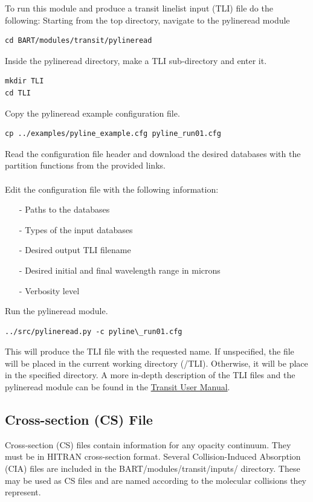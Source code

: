 \documentclass[letterpaper, 12pt]{article}
\begin{document}
\noindent
To run this module and produce a transit linelist input (TLI) file do the following:
\noindent
Starting from the top directory, navigate to the pylineread module

\begin{verbatim}
cd BART/modules/transit/pylineread
\end{verbatim}

\noindent
Inside the pylineread directory, make a TLI sub-directory and enter it.

\begin{verbatim}
mkdir TLI
cd TLI
\end{verbatim}

\noindent
Copy the pylineread example configuration file.

\begin{verbatim}
cp ../examples/pyline_example.cfg pyline_run01.cfg
\end{verbatim}

\noindent
Read the configuration file header and download the desired databases with the partition functions from the provided links.\\
\\
\noindent
Edit the configuration file with the following information:

\begin{enumerate}
\item[-] Paths to the databases
\item[-] Types of the input databases
\item[-] Desired output TLI filename
\item[-] Desired initial and final wavelength range in microns
\item[-] Verbosity level
\end{enumerate}

\noindent
Run the pylineread module.

\begin{verbatim}
../src/pylineread.py -c pyline\_run01.cfg
\end{verbatim}

\noindent
This will produce the TLI file with the requested name. If unspecified, the file will be placed in the current working directory (/TLI). Otherwise, it will be place in the specified directory. A more in-depth description of the TLI files and the pylineread module can be found in the \href{https://exosports.github.io/transit/doc/Transit_User_Manual.html}{Transit User Manual}.


\subsection{Cross-section (CS) File}
\label{sec:CS}
Cross-section (CS) files contain information for any opacity continuum. They must be in HITRAN cross-section format. Several Collision-Induced Absorption (CIA) files are included in the BART/modules/transit/inputs/ directory. These may be used as CS files and are named according to the molecular collisions they represent.
\end{document}
